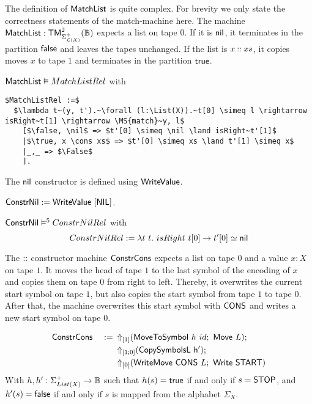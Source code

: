 The definition of $\MS{MatchList}$ is quite complex.  For brevity we only state the correctness statements of the match-machine here.  The machine
$\MS{MatchList} : \TM_{\Sigma_{\List(X)}^+}^2(\Bool)$ expects a list on tape $0$.  If it is $\nil$, it terminates in the partition $\false$ and leaves
the tapes unchanged.  If the list is $x \cons xs$, it copies moves $x$ to tape $1$ and terminates in the partition $\true$.

\begin{lemma}
  \label{lem:MatchList_Realise}
  $\MS{MatchList} \Realise MatchListRel$ with
\begin{lstlisting}[style=semicoqstyle]
$MatchListRel :=$
  $\lambda t~(y, t').~\forall (l:\List(X)).~t[0] \simeq l \rightarrow isRight~t[1] \rightarrow \MS{match}~y, l$
    [$\false, \nil$ => $t'[0] \simeq \nil \land isRight~t'[1]$
    |$\true, x \cons xs$ => $t'[0] \simeq xs \land t'[1] \simeq x$
    |_,_ => $\False$
    ].
\end{lstlisting}
\end{lemma}

The $\nil$ constructor is defined using $\MS{WriteValue}$.
\begin{definition}
  $\MS{ConstrNil} := \MS{WriteValue}~[\MS{NIL}]$.
\end{definition}
\begin{lemma}
  $\MS{ConstrNil} \RealiseIn{5} ConstrNilRel$ with
  \[
    ConstrNilRel := \lambda t~t.~isRight~t[0] \rightarrow t'[0] \simeq \nil
  \]
\end{lemma}

The $\cons$ constructor machine $\MS{ConstrCons}$ expects a list on tape $0$ and a value $x:X$ on tape $1$.  It moves the head of tape $1$ to the last
symbol of the encoding of $x$ and copies them on tape $0$ from right to left.  Thereby, it overwrites the current start symbol on tape $1$, but also
copies the start symbol from tape $1$ to tape $0$.  After that, the machine overwrites this start symbol with $\MS{CONS}$ and writes a new start
symbol on tape $0$.

\begin{definition}
  \label{def:Constr_cons}
  \begin{alignat*}{2}
    &\MS{ConstrCons}&~:=~& \LiftTapes{(\MS{MoveToSymbol}~h~id \Seq \MS{Move}~L)}{\Vector{1}} \Seq \\
    &               &    & \LiftTapes{(\MS{CopySymbolsL~h'})}{\Vector{1;0}} \Seq \\
    &               &    & \LiftTapes{(\MS{WriteMove}~\MS{CONS}~L \Seq \MS{Write}~\MS{START})}{\Vector{0}}
  \end{alignat*}
  With $h, h' : \Sigma_{List(X)}^+ \to \Bool$ such that $h(s)=\true$ if and only if $s=\MS{STOP}$, and $h'(s)=\false$ if and only if $s$ is mapped
  from the alphabet $\Sigma_X$.
\end{definition}


